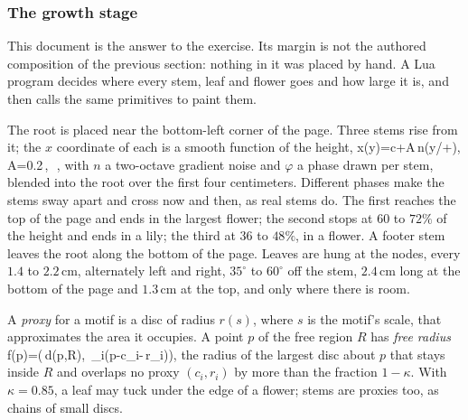 \subsubsection{The growth stage}

This document is the answer to the exercise. Its margin is not the authored composition of
the previous section: nothing in it was placed by hand. A Lua program decides where every
stem, leaf and flower goes and how large it is, and then calls the same primitives to paint
them.

\startconstruction[title={Stems}]
The root is placed near the bottom-left corner of the page. Three stems rise from it; the
$x$ coordinate of each is a smooth function of the height,
\startformula
  x(y)=c+A\,n\bigl(y/\lambda+\varphi\bigr),
  \qquad A=0.2\,,\ \lambda\in[6,9]\,,
\stopformula
with $n$ a two-octave gradient noise and $\varphi$ a phase drawn per stem, blended into the
root over the first four centimeters. Different phases make the stems sway apart and cross
now and then, as real stems do. The first reaches the top of the page and ends in the
largest flower; the second stops at $60$ to $72\%$ of the height and ends in a lily; the
third at $36$ to $48\%$, in a flower. A footer stem leaves the root along the bottom of the
page. Leaves are hung at the nodes, every $1.4$ to $2.2$\,cm, alternately left and right,
$35^\circ$ to $60^\circ$ off the stem, $2.4$\,cm long at the bottom of the page and $1.3$\,cm
at the top, and only where there is room.
\stopconstruction

\startdefinition
A \emph{proxy} for a motif is a disc of radius $r(s)$, where $s$ is the motif's scale, that
approximates the area it occupies. A point $p$ of the free region $R$ has \emph{free
radius}
\startformula
  f(p)=\min\Bigl(\,d(p,\partial R),\ \min_i\bigl(\Vert p-c_i\Vert-\kappa\,r_i\bigr)\Bigr),
\stopformula
the radius of the largest disc about $p$ that stays inside $R$ and overlaps no proxy
$(c_i,r_i)$ by more than the fraction $1-\kappa$. With $\kappa=0.85$, a leaf may tuck under
the edge of a flower; stems are proxies too, as chains of small discs.
\stopdefinition

